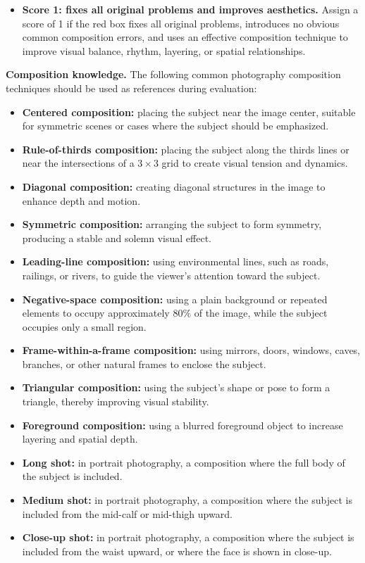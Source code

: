 \documentclass{llmxive}
\begin{document}
\begin{promptbox}
\begin{itemize}
    \item \textbf{Score 1: fixes all original problems and improves aesthetics.}
    Assign a score of 1 if the red box fixes all original problems, introduces no obvious common composition errors, and uses an effective composition technique to improve visual balance, rhythm, layering, or spatial relationships.
\end{itemize}

\textbf{Composition knowledge.}
The following common photography composition techniques should be used as references during evaluation:
\begin{itemize}
    \item \textbf{Centered composition:} placing the subject near the image center, suitable for symmetric scenes or cases where the subject should be emphasized.
    \item \textbf{Rule-of-thirds composition:} placing the subject along the thirds lines or near the intersections of a $3\times3$ grid to create visual tension and dynamics.
    \item \textbf{Diagonal composition:} creating diagonal structures in the image to enhance depth and motion.
    \item \textbf{Symmetric composition:} arranging the subject to form symmetry, producing a stable and solemn visual effect.
    \item \textbf{Leading-line composition:} using environmental lines, such as roads, railings, or rivers, to guide the viewer's attention toward the subject.
    \item \textbf{Negative-space composition:} using a plain background or repeated elements to occupy approximately 80\% of the image, while the subject occupies only a small region.
    \item \textbf{Frame-within-a-frame composition:} using mirrors, doors, windows, caves, branches, or other natural frames to enclose the subject.
    \item \textbf{Triangular composition:} using the subject's shape or pose to form a triangle, thereby improving visual stability.
    \item \textbf{Foreground composition:} using a blurred foreground object to increase layering and spatial depth.
    \item \textbf{Long shot:} in portrait photography, a composition where the full body of the subject is included.
    \item \textbf{Medium shot:} in portrait photography, a composition where the subject is included from the mid-calf or mid-thigh upward.
    \item \textbf{Close-up shot:} in portrait photography, a composition where the subject is included from the waist upward, or where the face is shown in close-up.
\end{itemize}


\end{promptbox}
\end{document}
